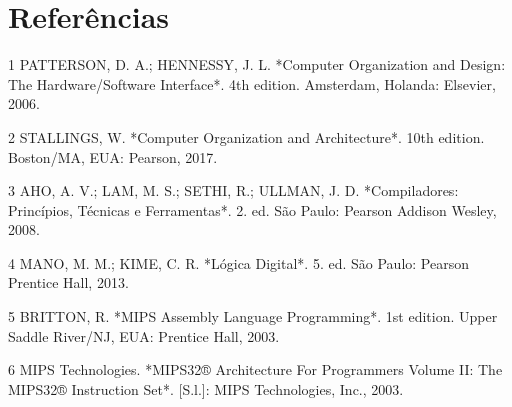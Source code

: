 \documentclass[
	12pt,				%
	openright,			%
	a4paper,			%
	english,			%
	french,				%
	spanish,			%
	brazil,				%
	]{abntex2}
\begin{document}
\postextual


\chapter*{Referências}

1 PATTERSON, D. A.; HENNESSY, J. L. *Computer Organization and Design: The Hardware/Software Interface*. 4th edition. Amsterdam, Holanda: Elsevier, 2006. 

2 STALLINGS, W. *Computer Organization and Architecture*. 10th edition. Boston/MA, EUA: Pearson, 2017.

3 AHO, A. V.; LAM, M. S.; SETHI, R.; ULLMAN, J. D. *Compiladores: Princípios, Técnicas e Ferramentas*. 2. ed. São Paulo: Pearson Addison Wesley, 2008.

4 MANO, M. M.; KIME, C. R. *Lógica Digital*. 5. ed. São Paulo: Pearson Prentice Hall, 2013.

5 BRITTON, R. *MIPS Assembly Language Programming*. 1st edition. Upper Saddle River/NJ, EUA: Prentice Hall, 2003.

6 MIPS Technologies. *MIPS32® Architecture For Programmers Volume II: The MIPS32® Instruction Set*. [S.l.]: MIPS Technologies, Inc., 2003.




\end{document}
